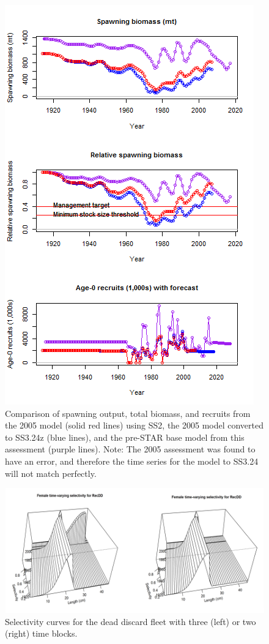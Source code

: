 \documentclass[12pt,]{article}
\begin{document}
\begin{figure}[htbp]
\centering
\includegraphics[height=0.95000\textwidth]{Figures/bridge_timeseries.png}
\caption{Comparison of spawning output, total biomass, and recruits from
the 2005 model (solid red lines) using SS2, the 2005 model converted to
SS3.24z (blue lines), and the pre-STAR base model from this assessment
(purple lines). Note: The 2005 assessment was found to have an error,
and therefore the time series for the model to SS3.24 will not match
perfectly. \label{fig:bridge_timeseries}}
\end{figure}

\begin{figure}[htbp]
\centering
\includegraphics{Figures/Request1.png}
\caption{Selectivity curves for the dead discard fleet with three (left)
or two (right) time blocks. \label{fig:Request1}}
\end{figure}
\end{document}
